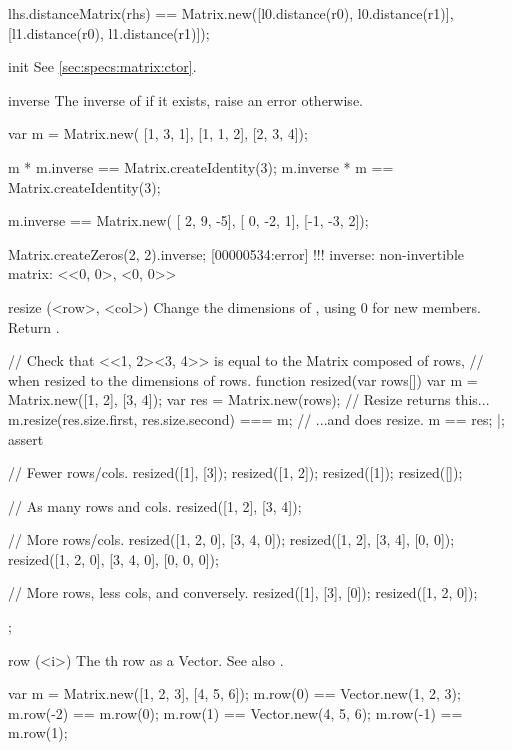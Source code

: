 \begin{urbiscriptapi}
\begin{urbiassert}
lhs.distanceMatrix(rhs)
  == Matrix.new([l0.distance(r0), l0.distance(r1)],
                [l1.distance(r0), l1.distance(r1)]);
\end{urbiassert}


\item[init]%
  See \autoref{sec:specs:matrix:ctor}.


\item[inverse]%
  The inverse of \this if it exists, raise an error otherwise.
\begin{urbiassert}
var m = Matrix.new(
  [1, 3, 1],
  [1, 1, 2],
  [2, 3, 4]);

m * m.inverse == Matrix.createIdentity(3);
m.inverse * m == Matrix.createIdentity(3);

m.inverse == Matrix.new(
  [ 2,  9, -5],
  [ 0, -2,  1],
  [-1, -3,  2]);

Matrix.createZeros(2, 2).inverse;
[00000534:error] !!! inverse: non-invertible matrix: <<0, 0>, <0, 0>>
\end{urbiassert}


\item[resize](<row>, <col>)%
  Change the dimensions of \this, using 0 for new members.  Return \this.
\begin{urbiscript}
// Check that <<1, 2><3, 4>> is equal to the Matrix composed of rows,
// when resized to the dimensions of rows.
function resized(var rows[])
{
  var m = Matrix.new([1, 2], [3, 4]);
  var res = Matrix.new(rows);
  // Resize returns this...
  m.resize(res.size.first, res.size.second) === m;
  // ...and does resize.
  m == res;
}|;
assert
{
  // Fewer rows/cols.
  resized([1], [3]);
  resized([1, 2]);
  resized([1]);
  resized([]);

  // As many rows and cols.
  resized([1, 2], [3, 4]);

  // More rows/cols.
  resized([1, 2, 0], [3, 4, 0]);
  resized([1, 2], [3, 4], [0, 0]);
  resized([1, 2, 0], [3, 4, 0], [0, 0, 0]);

  // More rows, less cols, and conversely.
  resized([1], [3], [0]);
  resized([1, 2, 0]);
};
\end{urbiscript}


\item[row](<i>)%
  The th row as a Vector.  See also .
\begin{urbiassert}
var m = Matrix.new([1, 2, 3], [4, 5, 6]);
m.row(0) == Vector.new(1, 2, 3);  m.row(-2) == m.row(0);
m.row(1) == Vector.new(4, 5, 6);  m.row(-1) == m.row(1);


\end{urbiassert}
\end{urbiscriptapi}
